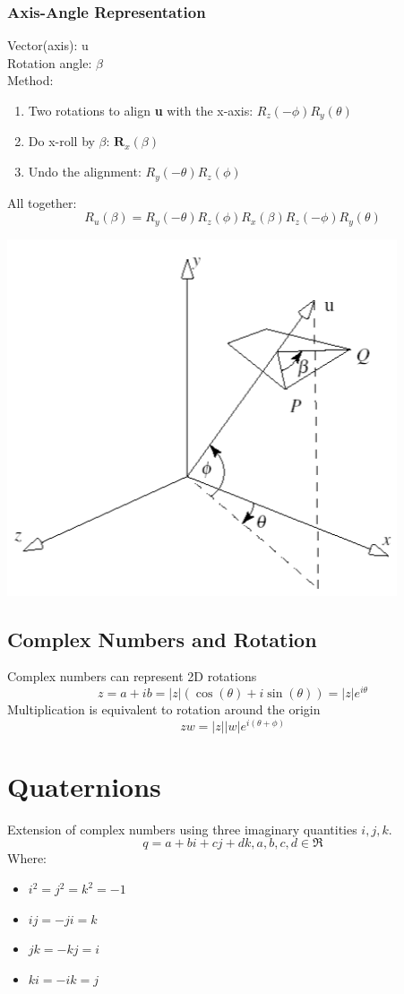 \documentclass{article}
\begin{document}
\subsubsection*{Axis-Angle Representation}
Vector(axis): u\\
Rotation angle: $\beta$\\
Method:
\begin{enumerate}
    \item Two rotations to align \textbf{u} with the x-axis: $R_z(-\phi)R_y(\theta)$
    \item Do x-roll by $\beta$: $\textbf{R}_x(\beta)$
    \item Undo the alignment: $R_y(-\theta)R_z(\phi)$
\end{enumerate}
All together:
\[R_u(\beta) = R_y(-\theta)R_z(\phi)R_x(\beta)R_z(-\phi)R_y(\theta)\]
\begin{center}
    \includegraphics*[scale=0.7]{W2_6.png}
\end{center}

\subsection*{Complex Numbers and Rotation}
Complex numbers can represent 2D rotations
\[z = a + ib = \vert z \vert(\cos(\theta) + i \sin(\theta)) = \vert z \vert e^{i \theta}\]
Multiplication is equivalent to rotation around the origin
\[zw = \vert z \vert \vert w \vert e^{i(\theta + \phi)}\]

\section*{Quaternions}
Extension of complex numbers using three imaginary quantities $i, j, k$.
\[q = a + bi + cj + dk, a, b, c, d \in \mathfrak{R}\]
Where:
\begin{itemize}
    \item $i^2 = j^2 = k^2 = -1$
    \item $ij = -ji = k$
    \item $jk = -kj = i$
    \item $ki = -ik = j$
\end{itemize}
\end{document}
